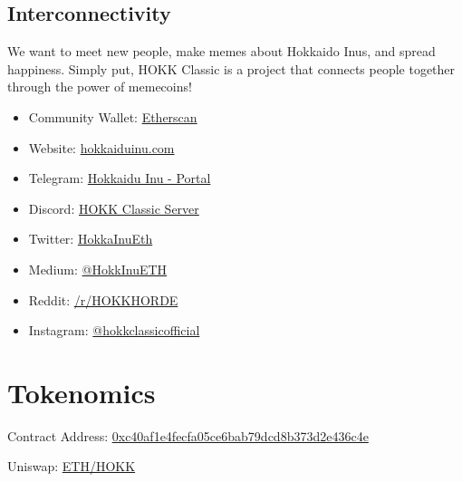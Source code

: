 \documentclass{article}
\begin{document}
\subsection{Interconnectivity}
We want to meet new people, make memes about Hokkaido Inus, and spread happiness. Simply put, HOKK Classic is a project that connects people together through the power of memecoins!

\bigskip
\begin{tcolorbox}[enhanced,attach boxed title to top center={yshift=-3mm,yshifttext=-1mm},
  colback=salmon1!10!white,colframe=pink1,colbacktitle=pink1,
  title=Community Links,fonttitle=\bfseries,
  boxed title style={size=small,colframe=pink1} ]
  \begin{itemize}
  \item Community Wallet: \href{https://etherscan.io/address/0x6bb28246454814C57EE15208B7a275ABcbeF58d3}{Etherscan}
  \item Website: \href{https://hokkaiduinu.com/}{hokkaiduinu.com}
  \item Telegram: \href{https://t.me/HokkaiduInuOfficial}{Hokkaidu Inu - Portal}
  \item Discord: \href{https://discord.gg/tY2JsTXP}{HOKK Classic Server}
  \item Twitter: \href{https://twitter.com/HokkaInuEth}{HokkaInuEth}
  \item Medium: \href{https://medium.com/@HokkInuETH}{@HokkInuETH}
  \item Reddit: \href{https://reddit.com/r/HOKKHORDE}{/r/HOKKHORDE}
  \item Instagram: \href{https://www.instagram.com/hokkclassicofficial/}{@hokkclassicofficial}
  \end{itemize}
\end{tcolorbox}

\newpage
\section{Tokenomics}
Contract Address: \href{https://etherscan.io/token/0xc40af1e4fecfa05ce6bab79dcd8b373d2e436c4e}{0xc40af1e4fecfa05ce6bab79dcd8b373d2e436c4e}

\smallskip
{\raggedleft Uniswap: \href{https://v2.info.uniswap.org/pair/0x9314941c11d6dee1d7bf93113eb74d4718949f3b}{ETH/HOKK}}
\end{document}
